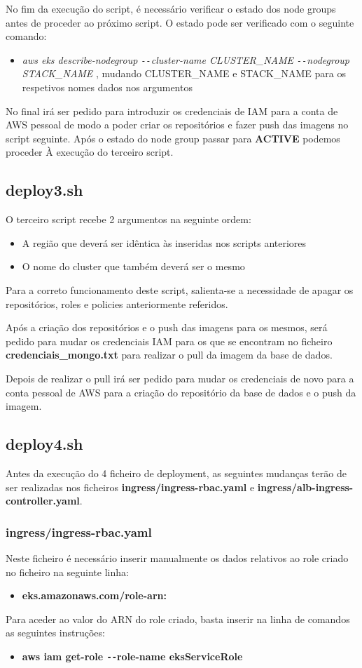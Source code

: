\documentclass[11pt,a4paper]{article}
\begin{document}
No fim da execução do script, é necessário verificar o estado dos node groups antes de proceder ao próximo script. O estado pode ser verificado com o seguinte comando: 
\begin{itemize}
	\item \textit{aws eks describe-nodegroup \texttt{-{}-}cluster-name CLUSTER\_NAME \texttt{-{}-}nodegroup STACK\_NAME} , mudando CLUSTER\_NAME e STACK\_NAME para os respetivos nomes dados nos argumentos
\end{itemize}
No final irá ser pedido para introduzir os credenciais de IAM para a conta de AWS pessoal de modo a poder criar os repositórios e fazer push das imagens no script seguinte.
Após o estado do node group passar para \textbf{ACTIVE} podemos proceder À execução do terceiro script.

\subsection{deploy3.sh}
O terceiro script recebe 2 argumentos na seguinte ordem:
\begin{itemize}
	\item A região que deverá ser idêntica às inseridas nos scripts anteriores
	\item O nome do cluster que também deverá ser o mesmo
\end{itemize}
Para a correto funcionamento deste script, salienta-se a necessidade de apagar os repositórios, roles e policies anteriormente referidos.

Após a criação dos repositórios e o push das imagens para os mesmos, será pedido para mudar os credenciais IAM para os que se encontram no ficheiro \textbf{credenciais\_mongo.txt} para realizar o pull da imagem da base de dados.

Depois de realizar o pull irá ser pedido para mudar os credenciais de novo para a conta pessoal de AWS para a criação do repositório da base de dados e o push da imagem.

\subsection{deploy4.sh}
Antes da execução do 4 ficheiro de deployment, as seguintes mudanças terão de ser realizadas nos ficheiros \textbf{ingress/ingress-rbac.yaml} e \textbf{ingress/alb-ingress-controller.yaml}.

\subsubsection{ingress/ingress-rbac.yaml}
Neste ficheiro é necessário inserir manualmente os dados relativos ao role criado no ficheiro na seguinte linha:
\begin{itemize}
	\item \textbf{eks.amazonaws.com/role-arn:}
\end{itemize}
Para aceder ao valor do ARN do role criado, basta inserir na linha de comandos as seguintes instruções:
\begin{itemize}
	\item \textbf{aws iam get-role \texttt{-{}-}role-name eksServiceRole}
\end{itemize}
\end{document}
